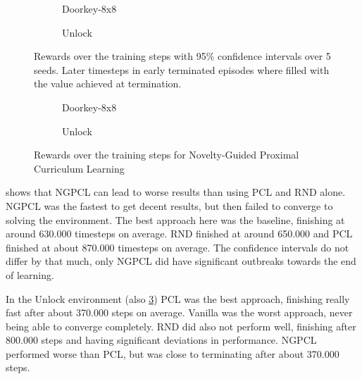 \documentclass{article}
\begin{document}
\begin{figure}[ht]
  \begin{subfigure}{0.49\textwidth}
    
    \caption{Doorkey-8x8}
    \label{fig:all:doorkey8}
  \end{subfigure}
  \begin{subfigure}{0.49\textwidth}
    
    \caption{Unlock}
    \label{fig:all:unlock}
  \end{subfigure}
  \caption{Rewards over the training steps with 95\% confidence intervals over 5 seeds. Later timesteps in early terminated episodes where filled with the value achieved at termination.}
  \label{fig:all}
\end{figure}

\begin{figure}[ht]
  \begin{subfigure}{0.49\textwidth}
    
    \caption{Doorkey-8x8}
    \label{fig:comb:doorkey8}
  \end{subfigure}
  \begin{subfigure}{0.49\textwidth}
    
    \caption{Unlock}
    \label{fig:comb:unlock}
  \end{subfigure}
  \caption{Rewards over the training steps for Novelty-Guided Proximal Curriculum Learning}
  \label{fig:comb}
\end{figure}

 shows that NGPCL can lead to worse results than using PCL and RND alone. NGPCL was the fastest to get decent results, but then failed to converge to solving the environment. The best approach here was the baseline, finishing at around 630.000 timesteps on average. RND finished at around 650.000 and PCL finished at about 870.000 timesteps on average. The confidence intervals do not differ by that much, only NGPCL did have significant outbreaks towards the end of learning.

In the Unlock environment (also \cref{fig:all}) PCL was the best approach, finishing really fast after about 370.000 steps on average. Vanilla was the worst approach, never being able to converge completely. RND did also not perform well, finishing after 800.000 steps and having significant deviations in performance. NGPCL performed worse than PCL, but was close to terminating after about 370.000 steps.
\end{document}
